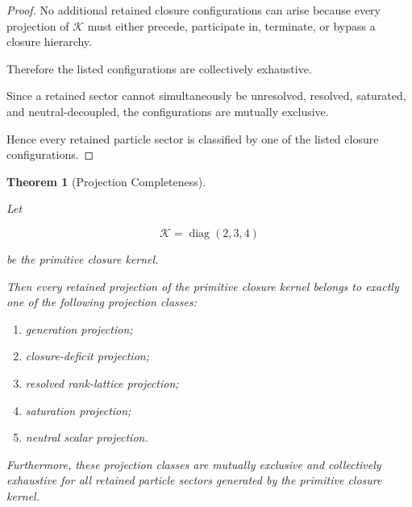 \documentclass[11pt]{article}
\newtheorem{theorem}{Theorem}[section]
\theoremstyle{definition}
\theoremstyle{remark}
\begin{document}
\begin{proof}
No additional retained closure configurations can arise because
every projection of \(\mathcal K\) must either precede,
participate in, terminate, or bypass a closure hierarchy.

Therefore the listed configurations are collectively exhaustive.

Since a retained sector cannot simultaneously be unresolved,
resolved, saturated, and neutral-decoupled, the configurations
are mutually exclusive.

Hence every retained particle sector is classified by one of
the listed closure configurations.

\end{proof}


\begin{theorem}[Projection Completeness]
\label{thm:projection_completeness}

Let

\begin{equation}
\mathcal K
=
\operatorname{diag}(2,3,4)
\end{equation}

be the primitive closure kernel.

Then every retained projection of the primitive closure kernel
belongs to exactly one of the following projection classes:

\begin{enumerate}

\item generation projection;

\item closure-deficit projection;

\item resolved rank-lattice projection;

\item saturation projection;

\item neutral scalar projection.

\end{enumerate}

Furthermore, these projection classes are mutually exclusive and
collectively exhaustive for all retained particle sectors
generated by the primitive closure kernel.

\end{theorem}
\end{document}
